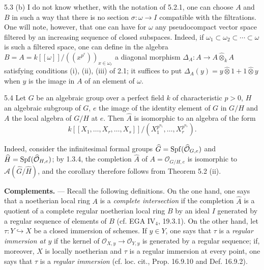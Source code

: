 \begin{remarks}{5.3}
(b) I do not know whether, with the notation of 5.2.1, one can choose $A$ and $B$ in such a way that there is no section $\sigma:\omega\to I$ compatible with the filtrations. One will note, however, that one can have for $\omega$ any pseudocompact vector space filtered by an increasing sequence of closed subspaces. Indeed, if $\omega_1\subset\omega_2\subset\cdots\subset\omega$ is such a filtered space, one can define in the algebra $B=A=k[[\omega]]/((x^{p^r}))_{x\in\omega_r}$ a diagonal morphism $\Delta_A:A\to A\widehat\otimes_k A$ satisfying conditions (i), (ii), (iii) of 2.1; it suffices to put $\Delta_A(y)=y\widehat\otimes1+1\widehat\otimes y$ when $y$ is the image in $A$ of an element of $\omega$.
\end{remarks}

\begin{corollary}{5.4}\label{VIIB.5.4}
Let $G$ be an algebraic group over a perfect field $k$ of characteristic $p>0$, $H$ an algebraic subgroup of $G$, $e$ the image of the identity element of $G$ in $G/H$ and $A$ the local algebra of $G/H$ at $e$. Then $\widehat A$ is isomorphic to an algebra of the form
\[
k[[X_1,\ldots,X_r,\ldots,X_s]]/(X_1^{p^{n_1}},\ldots,X_r^{p^{n_r}}).
\]
\end{corollary}
Indeed, consider the infinitesimal formal groups $\widehat G=\operatorname{Spf}(\widehat{\mathcal O}_{G,e})$ and $\widehat H=\operatorname{Spf}(\widehat{\mathcal O}_{H,e})$; by 1.3.4, the completion $\widehat A$ of $A=\mathcal O_{G/H,e}$ is isomorphic to $\mathscr A(\widehat G/\widehat H)$, and the corollary therefore follows from Theorem 5.2 (ii).

\textbf{Complements.} --- Recall the following definitions. On the one hand, one says that a noetherian local ring $A$ is a \emph{complete intersection} if the completion $\widehat A$ is a quotient of a complete regular noetherian local ring $B$ by an ideal $I$ generated by a regular sequence of elements of $B$ (cf. EGA IV$_4$, 19.3.1). On the other hand, let $\tau:Y\hookrightarrow X$ be a closed immersion of schemes. If $y\in Y$, one says that $\tau$ is a \emph{regular immersion at $y$} if the kernel of $\mathcal O_{X,y}\to\mathcal O_{Y,y}$ is generated by a regular sequence; if, moreover, $X$ is locally noetherian and $\tau$ is a regular immersion at every point, one says that $\tau$ is a \emph{regular immersion} (cf. loc. cit., Prop. 16.9.10 and Def. 16.9.2).

